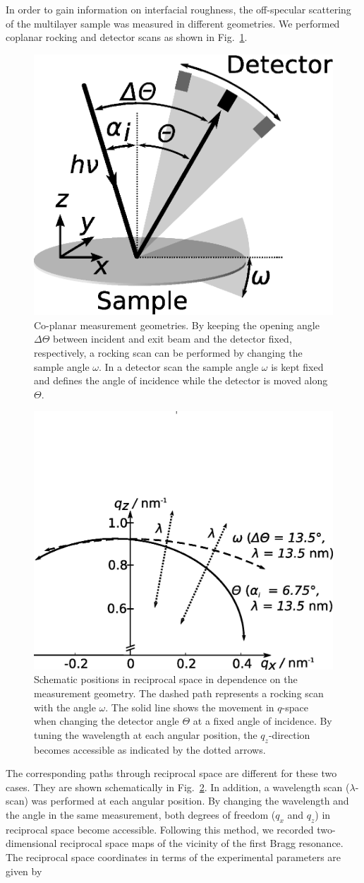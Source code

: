 \documentclass[twocolumn,osajnl,showpacs,superscriptaddress,11pt]{revtex4-1}
\begin{document}
In order to gain information on interfacial roughness, the off-specular scattering of the multilayer sample was measured in different geometries. We performed coplanar rocking and detector scans as shown in Fig.~\ref{fig:measurementGeometry}.
\begin{figure}
	\includegraphics[width=0.3
	\textwidth]{Streugeometrie} \caption{Co-planar measurement geometries. By keeping the opening angle $\Delta\Theta$ between incident and exit beam and the detector fixed, respectively, a rocking scan can be performed by changing the sample angle $\omega$. In a detector scan the sample angle $\omega$ is kept fixed and defines the angle of incidence while the detector is moved along $\Theta$.} \label{fig:measurementGeometry} 
\end{figure}
\begin{figure}
	\includegraphics[width=0.45
	\textwidth]{Qspace_paths} \caption{Schematic positions in reciprocal space in dependence on the measurement geometry. The dashed path represents a rocking scan with the angle $\omega$. The solid line shows the movement in $q$-space when changing the detector angle $\Theta$ at a fixed angle of incidence. By tuning the wavelength at each angular position, the $q_z$-direction becomes accessible as indicated by the dotted arrows.} \label{fig:pathsInQ} 
\end{figure}
The corresponding paths through reciprocal space are different for these two cases. They are shown schematically in Fig.~\ref{fig:pathsInQ}. In addition, a wavelength scan ($\lambda$-scan) was performed at each angular position. By changing the wavelength and the angle in the same measurement, both degrees of freedom ($q_x$ and $q_z$) in reciprocal space become accessible. Following this method, we recorded two-dimensional reciprocal space maps of the vicinity of the first Bragg resonance. The reciprocal space coordinates in terms of the experimental parameters are given by 
\end{document}
